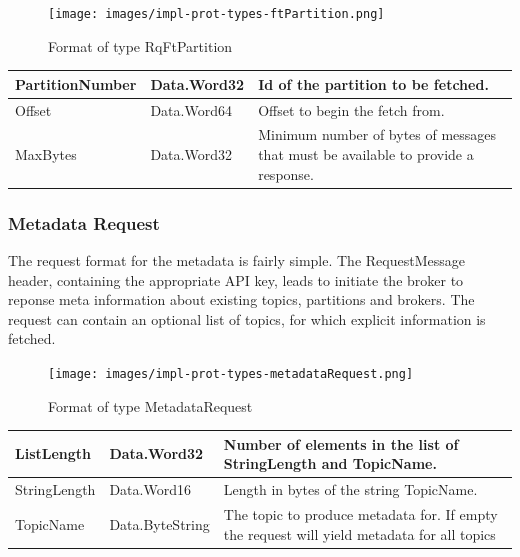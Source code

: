 \begin{figure}[H]
    \centering
    \texttt{[image: images/impl-prot-types-ftPartition.png]}
    \caption{Format of type RqFtPartition }
    \label{fig:impl-prot-types-ftPartition}
\end{figure}

\begin{table}[H]
\centering
\begin{tabular}{ l  l  p{8cm} }
\hline
PartitionNumber & Data.Word32 & Id of the partition to be fetched.                                          \\ \hline
Offset          & Data.Word64 & Offset to begin the fetch from.                                                \\ \hline
MaxBytes        & Data.Word32 & Minimum number of bytes of messages that must be
available to provide a response. \\ \hline
\end{tabular}
\end{table}

\subsubsection{Metadata Request}
The request format for the metadata is fairly simple. The
RequestMessage header, containing the appropriate API key, leads to initiate the
broker to reponse meta information about existing topics, partitions and
brokers. The request can contain an optional list of topics, for which explicit
information is fetched.

\begin{figure}[H]
    \centering
    \texttt{[image: images/impl-prot-types-metadataRequest.png]}
    \caption{Format of type MetadataRequest}
    \label{fig:impl-prot-types-ftPartition}
\end{figure}

\begin{table}[H]
\centering
\begin{tabular}{ l  l  p{8cm} }
\hline
ListLength    & Data.Word32 & Number of elements in the list of StringLength and
TopicName.                                                                                             \\ \hline
StringLength      & Data.Word16     & Length in bytes of the string TopicName.              \\ \hline
TopicName         & Data.ByteString & The topic to produce metadata for. If
empty the request will yield metadata for all topics  \\ \hline
\end{tabular}
\end{table}

